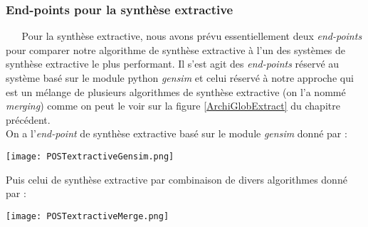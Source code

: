 \subsubsection{End-points pour la synthèse extractive}
$ _{} $ $ _{} $ $ _{} $ $ _{} $ $ _{} $Pour la synthèse extractive, nous avons prévu essentiellement deux \textit{end-points} pour comparer notre algorithme de synthèse extractive à l'un des systèmes de synthèse extractive le plus performant. Il s'est agit des \textit{end-points} réservé au système basé sur le module python \textit{gensim} et celui réservé à notre approche qui est un mélange de plusieurs algorithmes de synthèse extractive (on l'a nommé \textit{merging}) comme on peut le voir sur la figure \ref{ArchiGlobExtract} du chapitre précédent.\\
On a l'\textit{end-point} de synthèse extractive basé sur le module \textit{gensim} donné par :
\begin{center}
\texttt{[image: POSTextractiveGensim.png]}
\end{center}
Puis celui de synthèse extractive par combinaison de divers algorithmes donné par :
\begin{center}
\texttt{[image: POSTextractiveMerge.png]}
\end{center}
